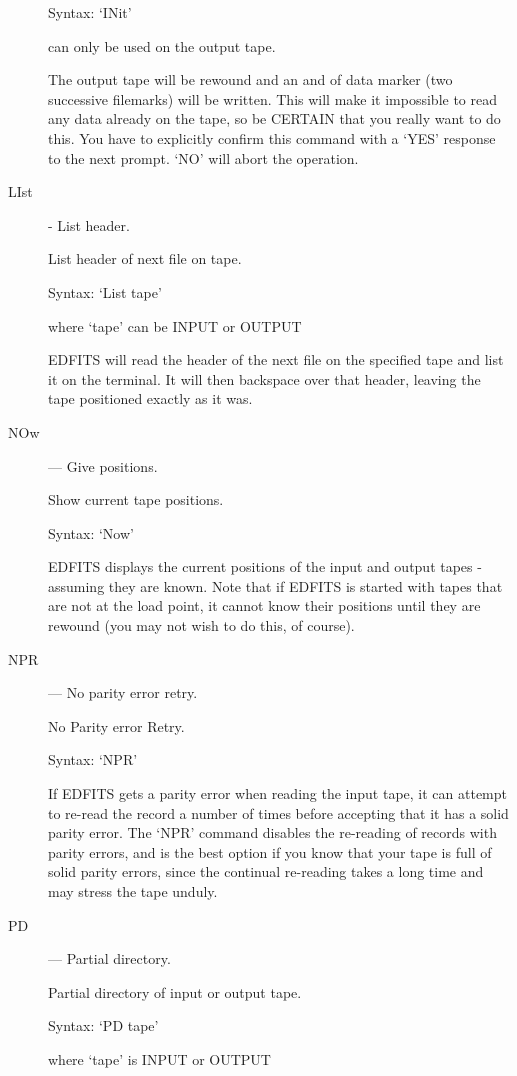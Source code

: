 \begin{description}
Syntax:  `INit'            

can only be used on the output tape.

The output tape will be rewound and an and of data marker (two
successive filemarks) will be written. This will make it impossible
to read any data already on the tape, so be CERTAIN that you really
want to do this. You have to explicitly confirm this command with a
`YES' response to the next prompt.  `NO' will abort the operation.

\item [LIst] - List header.

List header of next file on tape.

Syntax:   `List  tape'    

where `tape' can be INPUT or OUTPUT

EDFITS will read the header of the next file on the specified tape
and list it on the terminal. It will then backspace over that header, 
leaving the tape positioned exactly as it was.

\item [NOw] --- Give positions.

Show current tape positions.

Syntax:   `Now'

EDFITS displays the current positions of the input and output
tapes - assuming they are known.  Note that if EDFITS is started
with tapes that are not at the load point, it cannot know their
positions until they are rewound (you may not wish to do this, of
course).

\item [NPR] --- No parity error retry.

No Parity error Retry.

Syntax:   `NPR'

If EDFITS gets a parity error when reading the input tape, it can
attempt to re-read the record a number of times before accepting
that it has a solid parity error.  The `NPR' command disables the 
re-reading of records with parity errors, and is the best option if 
you know that your tape is full of solid parity errors, since the
continual re-reading takes a long time and may stress the tape
unduly.

\item [PD] --- Partial directory.

Partial directory of input or output tape.

Syntax:  `PD  tape'      

where `tape' is INPUT or OUTPUT


\end{description}
